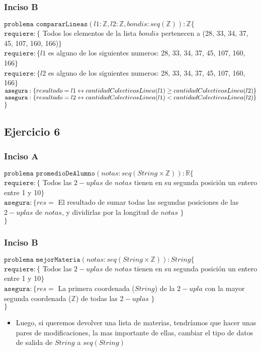 	\subsubsection{Inciso B}
	$\texttt{problema compararLineas}(l1:\mathbb{Z},l2:\mathbb{Z},bondis:seq(\mathbb{Z})) : \mathbb{Z} \lbrace$\\
	$\texttt{requiere}:\lbrace$ Todos los elementos de la lista $bondis$ pertenecen a (28, 33, 34, 37, 45, 107, 160, 166)$\rbrace$\\
	$\texttt{requiere}:\lbrace l1$ es alguno de los siguientes numeros: 28, 33, 34, 37, 45, 107, 160, 166$\rbrace$\\
	$\texttt{requiere}:\lbrace l2$ es alguno de los siguientes numeros: 28, 33, 34, 37, 45, 107, 160, 166$\rbrace$\\
	$\texttt{asegura}:\lbrace resultado=l1 \leftrightarrow cantidadColectivosLinea(l1)\geq cantidadColectivosLinea(l2)\rbrace$\\
	$\texttt{asegura}:\lbrace resultado=l2 \leftrightarrow cantidadColectivosLinea(l1)< cantidadColectivosLinea(l2)\rbrace$\\
	$\rbrace$
	
	\subsection{Ejercicio 6}
	\subsubsection{Inciso A}
	$\texttt{problema promedioDeAlumno}(notas:seq(String \times \mathbb{Z})) : \mathbb{R} \lbrace$\\
	$\texttt{requiere}:\lbrace$ Todos las $2-uplas$ de $notas$ tienen en su segunda posición un entero entre 1 y 10$\rbrace$\\
	$\texttt{asegura}:\lbrace res =$ El resultado de sumar todas las segundas posiciones de las $2-uplas$ de $notas$, y dividirlas por la longitud de $notas$ $\rbrace$\\
	$\rbrace$
	
	\subsubsection{Inciso B}
	$\texttt{problema mejorMateria}(notas:seq(String \times \mathbb{Z})) : String \lbrace$\\
	$\texttt{requiere}:\lbrace$ Todos las $2-uplas$ de $notas$ tienen en su segunda posición un entero entre 1 y 10$\rbrace$\\
	$\texttt{asegura}:\lbrace res=$ La primera coordenada ($String$) de la $2-upla$ con la mayor segunda coordenada ($\mathbb{Z}$) de todas las $2-uplas$ $\rbrace$\\
	$\rbrace$\\
	\begin{itemize}
	\item Luego, si queremos devolver una lista de materias, tendríamos que hacer unas pares de modificaciones, la mas importante de ellas, cambiar el tipo de datos de salida de $String$ a $seq(String)$
	\end{itemize}
	
